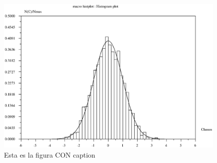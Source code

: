 \documentclass[12pt]{article}
\begin{document}
\begin{figure}[htbp]
  \centering
  \includegraphics[width=.9\textwidth]{dummy-plot.eps}
  \caption{Esta es la figura CON caption}
  \label{fig:Hola2}
\end{figure}



\listoffigures
\end{document}
